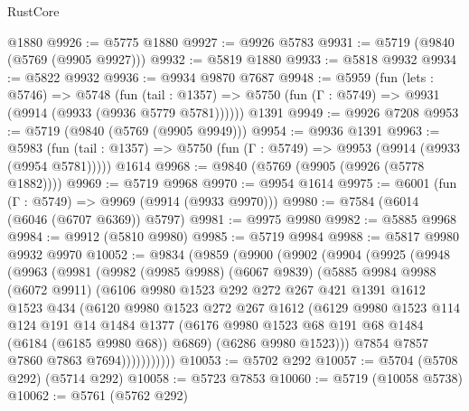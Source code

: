 \begin{lexlean}{RustCore}
\begin{coremodule}
    @1880
@9926 := @5775 @1880
@9927 := @9926 @5783
@9931 := @5719 (@9840 (@5769 (@9905 @9927)))
@9932 := @5819 @1880
@9933 := @5818 @9932
@9934 := @5822 @9932
@9936 := @9934 @9870 @7687
@9948 := @5959
    (fun (lets : @5746) =>
    @5748
      (fun (tail : @1357) => @5750 (fun (Γ : @5749) => @9931 (@9914 (@9933 (@9936 @5779 @5781))))))
    @1391
@9949 := @9926 @7208
@9953 := @5719 (@9840 (@5769 (@9905 @9949)))
@9954 := @9936 @1391
@9963 := @5983
    (fun (tail : @1357) => @5750 (fun (Γ : @5749) => @9953 (@9914 (@9933 (@9954 @5781)))))
    @1614
@9968 := @9840 (@5769 (@9905 (@9926 (@5778 @1882))))
@9969 := @5719 @9968
@9970 := @9954 @1614
@9975 := @6001 (fun (Γ : @5749) => @9969 (@9914 (@9933 @9970)))
@9980 := @7584 (@6014 (@6046 (@6707 @6369)) @5797)
@9981 := @9975 @9980
@9982 := @5885 @9968
@9984 := @9912 (@5810 @9980)
@9985 := @5719 @9984
@9988 := @5817 @9980 @9932 @9970
@10052 := @9834
    (@9859
      (@9900
        (@9902
          (@9904
            (@9925
              (@9948
                (@9963
                  (@9981
                    (@9982
                      (@9985 @9988)
                      (@6067 @9839)
                      (@5885
                        @9984
                        @9988
                        (@6072 @9911)
                        (@6106
                          @9980
                          @1523
                          @292
                          @272
                          @267
                          @421
                          @1391
                          @1612
                          @1523
                          @434
                          (@6120
                            @9980
                            @1523
                            @272
                            @267
                            @1612
                            (@6129
                              @9980
                              @1523
                              @114
                              @124
                              @191
                              @14
                              @1484
                              @1377
                              (@6176 @9980 @1523 @68 @191 @68 @1484 (@6184 (@6185 @9980 @68)) @6869)
                              (@6286 @9980 @1523)))
                          @7854
                          @7857
                          @7860
                          @7863
                          @7694)))))))))))
@10053 := @5702 @292
@10057 := @5704 (@5708 @292) (@5714 @292)
@10058 := @5723 @7853
@10060 := @5719 (@10058 @5738)
@10062 := @5761 (@5762 @292)

\end{coremodule}
\end{lexlean}
